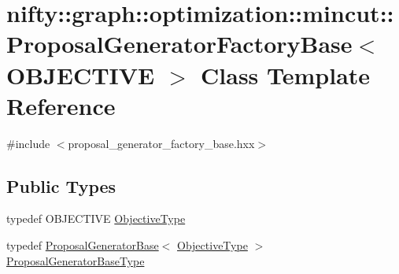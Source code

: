 \hypertarget{classnifty_1_1graph_1_1optimization_1_1mincut_1_1ProposalGeneratorFactoryBase}{}\section{nifty\+:\+:graph\+:\+:optimization\+:\+:mincut\+:\+:Proposal\+Generator\+Factory\+Base$<$ O\+B\+J\+E\+C\+T\+I\+V\+E $>$ Class Template Reference}
\label{classnifty_1_1graph_1_1optimization_1_1mincut_1_1ProposalGeneratorFactoryBase}


{\ttfamily \#include $<$proposal\+\_\+generator\+\_\+factory\+\_\+base.\+hxx$>$}

\subsection*{Public Types}
\begin{DoxyCompactItemize}
\item 
typedef O\+B\+J\+E\+C\+T\+I\+V\+E \hyperlink{classnifty_1_1graph_1_1optimization_1_1mincut_1_1ProposalGeneratorFactoryBase_aea20502050107a64eb798532653bf4ea}{Objective\+Type}
\item 
typedef \hyperlink{classnifty_1_1graph_1_1optimization_1_1mincut_1_1ProposalGeneratorBase}{Proposal\+Generator\+Base}$<$ \hyperlink{classnifty_1_1graph_1_1optimization_1_1mincut_1_1ProposalGeneratorFactoryBase_aea20502050107a64eb798532653bf4ea}{Objective\+Type} $>$ \hyperlink{classnifty_1_1graph_1_1optimization_1_1mincut_1_1ProposalGeneratorFactoryBase_a7febea23cd14e9c4d3e5aec2ac33e67f}{Proposal\+Generator\+Base\+Type}
\end{DoxyCompactItemize}
